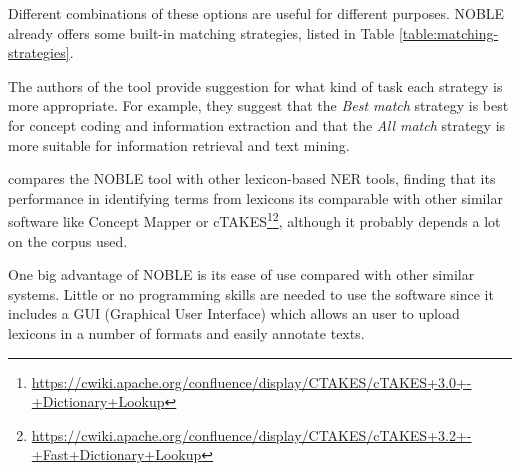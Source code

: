Different combinations of these options are useful for different purposes. NOBLE already offers some built-in matching strategies, listed in Table \ref{table:matching-strategies}.

\begin{table}[ht]
\centering
\caption{NOBLE matching strategies present in the GUI interface. Adapted from \citep{Tseytlin2016}. This correspond to the options used in the GUI tool.}
\label{table:matching-strategies}
\end{table}

The authors of the tool provide suggestion for what kind of task each strategy is more appropriate. For example, they suggest that the \textit{Best match} strategy is best for concept coding and information extraction and that the \textit{All match} strategy is more suitable for information retrieval and text mining.

\citep{Tseytlin2016} compares the NOBLE tool with other lexicon-based NER tools, finding that its performance in identifying terms from lexicons its comparable with other similar software like Concept Mapper \citep{Stewart} or cTAKES\footnote{\url{https://cwiki.apache.org/confluence/display/CTAKES/cTAKES+3.0+-+Dictionary+Lookup}}\footnote{\url{https://cwiki.apache.org/confluence/display/CTAKES/cTAKES+3.2+-+Fast+Dictionary+Lookup}}, although it probably depends a lot on the corpus used.

One big advantage of NOBLE is its ease of use compared with other similar systems. Little or no programming skills are needed to use the software since it includes a GUI (Graphical User Interface) which allows an user to upload lexicons in a number of formats and easily annotate texts.

